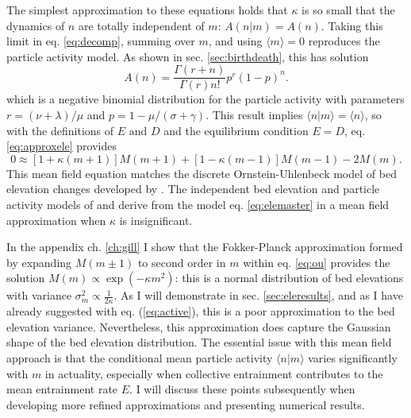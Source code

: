 The simplest approximation to these equations holds that $\kappa$ is so small that the dynamics of $n$ are totally independent of $m$: $A(n|m) = A(n)$. Taking this limit in eq. \ref{eq:decomp}, summing over $m$, and using $\langle m \rangle = 0$ reproduces the \citet{Ancey2008} particle activity model.
As shown in sec. \ref{sec:birthdeath}, this has solution
\begin{equation} A(n) = \frac{\Gamma(r+n)}{\Gamma(r)n!}p^r(1-p)^n.\label{eq:ancey}\end{equation}
which is a negative binomial distribution for the particle activity with parameters $r=(\nu+\lambda)/\mu$ and $p=1-\mu/(\sigma+\gamma).$
This result implies $\langle n | m \rangle = \langle n \rangle$, so with the definitions of $E$ and $D$ and the equilibrium condition $E=D$, eq. \ref{eq:approxele} provides
\begin{equation}0 \approx [1+\kappa(m+1)]M(m+1) + [1-\kappa(m-1)]M(m-1)-2M(m). \label{eq:ou} \end{equation}
This mean field equation matches the discrete Ornstein-Uhlenbeck model of bed elevation changes developed by \citet{Martin2014}.
The independent bed elevation and particle activity models of \citet{Martin2014} and \citet{Ancey2008} derive from the model eq. \ref{eq:elemaster} in a mean field approximation when $\kappa$ is insignificant.

In the appendix ch. \ref{ch:gill} I show that the Fokker-Planck approximation \citep{Gardiner1983} formed by expanding $M(m\pm 1)$ to second order in $m$ within eq. \ref{eq:ou} provides the solution $M(m) \propto \exp(-\kappa m^2)$: this is a normal distribution of bed elevations with variance $\sigma_m^2 \propto \frac{1}{2\kappa}$.
As I will demonstrate in sec. \ref{sec:eleresults}, and as I have already suggested with eq. (\ref{eq:active}), this is a poor approximation to the bed elevation variance. Nevertheless, this approximation does capture the Gaussian shape of the bed elevation distribution.
The essential issue with this mean field approach is that the conditional mean particle activity $\langle n | m \rangle$ varies significantly with $m$ in actuality, especially when collective entrainment contributes to the mean entrainment rate $E$. I will discuss these points subsequently when developing more refined approximations and presenting numerical results.

